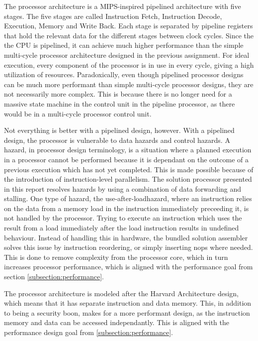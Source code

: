The processor architecture is a MIPS-inspired pipelined architecture with five stages.
The five stages are called Instruction Fetch, Instruction Decode, Execution, Memory and Write Back.
Each stage is separated by pipeline registers that hold the relevant data for the different stages between clock cycles.
Since the the CPU is pipelined, it can achieve much higher performance than the simple multi-cycle processor architecture designed in the previous assignment\cite{assignment-1}.
For ideal execution, every component of the processor is in use in every cycle, giving a high utilization of resources.
Paradoxically, even though pipelined processor designs can be much more performant than simple multi-cycle processor designs, they are not necessarily more complex.
This is because there is no longer need for a massive state machine in the control unit in the pipeline processor, as there would be in a multi-cycle processor control unit.

Not everything is better with a pipelined design, however.
With a pipelined design, the processor is vulnerable to data hazards and control hazards.
A hazard, in processor design terminology, is a situation where a planned execution in a processor cannot be performed because it is dependant on the outcome of a previous execution which has not yet completed.
This is made possible because of the introduction of instruction-level parallelism.
The solution processor presented in this report resolves hazards by using a combination of data forwarding and stalling.
One type of hazard, the use-after-load\cn hazard, where an instruction relies on the data from a memory load in the instruction immediately preceeding it, is not handled by the processor.
Trying to execute an instruction which uses the result from a load immediately after the load instruction results in undefined behaviour.
Instead of handling this in hardware, the bundled solution assembler solves this issue by instruction reordering, or simply inserting nops where needed.
This is done to remove complexity from the processor core, which in turn increases processor performance, which is aligned with the performance goal from section \vref{subsection:performance}.

The processor architecture is modeled after the Harvard Architecture design, which means that it has separate instruction and data memory.
This, in addition to being a security boon, makes for a more performant design, as the instruction memory and data can be accessed independantly.
This is aligned with the performance design goal from \vref{subsection:performance}.

